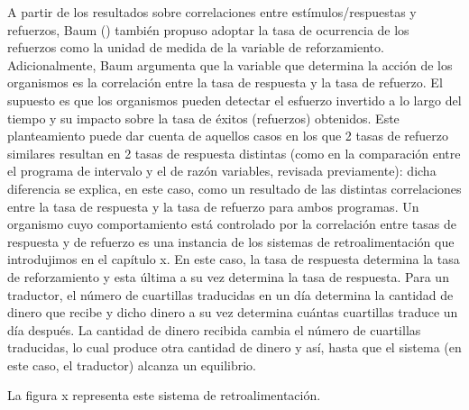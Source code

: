 \documentclass[
  letterpaper,
]{book}
\begin{document}
A partir de los resultados sobre correlaciones entre
estímulos/respuestas y refuerzos, Baum () también propuso adoptar la
tasa de ocurrencia de los refuerzos como la unidad de medida de la
variable de reforzamiento. Adicionalmente, Baum argumenta que la
variable que determina la acción de los organismos es la correlación
entre la tasa de respuesta y la tasa de refuerzo. El supuesto es que los
organismos pueden detectar el esfuerzo invertido a lo largo del tiempo y
su impacto sobre la tasa de éxitos (refuerzos) obtenidos. Este
planteamiento puede dar cuenta de aquellos casos en los que 2 tasas de
refuerzo similares resultan en 2 tasas de respuesta distintas (como en
la comparación entre el programa de intervalo y el de razón variables,
revisada previamente): dicha diferencia se explica, en este caso, como
un resultado de las distintas correlaciones entre la tasa de respuesta y
la tasa de refuerzo para ambos programas. Un organismo cuyo
comportamiento está controlado por la correlación entre tasas de
respuesta y de refuerzo es una instancia de los sistemas de
retroalimentación que introdujimos en el capítulo x. En este caso, la
tasa de respuesta determina la tasa de reforzamiento y esta última a su
vez determina la tasa de respuesta. Para un traductor, el número de
cuartillas traducidas en un día determina la cantidad de dinero que
recibe y dicho dinero a su vez determina cuántas cuartillas traduce un
día después. La cantidad de dinero recibida cambia el número de
cuartillas traducidas, lo cual produce otra cantidad de dinero y así,
hasta que el sistema (en este caso, el traductor) alcanza un equilibrio.

La figura x representa este sistema de retroalimentación.
\href{DraggedImage-3.png}{}
\end{document}
